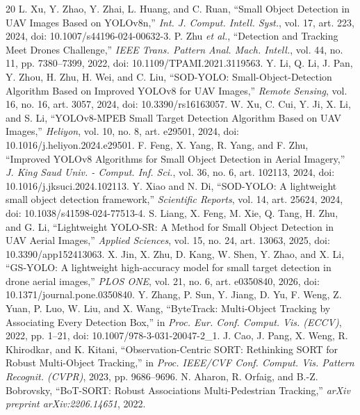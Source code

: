 \documentclass[conference]{IEEEtran}
\begin{document}
\begin{thebibliography}{20}
 L. Xu, Y. Zhao, Y. Zhai, L. Huang, and C. Ruan, ``Small Object Detection in UAV Images Based on YOLOv8n,'' \textit{Int. J. Comput. Intell. Syst.}, vol. 17, art. 223, 2024, doi: 10.1007/s44196-024-00632-3.
 P. Zhu \textit{et al.}, ``Detection and Tracking Meet Drones Challenge,'' \textit{IEEE Trans. Pattern Anal. Mach. Intell.}, vol. 44, no. 11, pp. 7380--7399, 2022, doi: 10.1109/TPAMI.2021.3119563.
 Y. Li, Q. Li, J. Pan, Y. Zhou, H. Zhu, H. Wei, and C. Liu, ``SOD-YOLO: Small-Object-Detection Algorithm Based on Improved YOLOv8 for UAV Images,'' \textit{Remote Sensing}, vol. 16, no. 16, art. 3057, 2024, doi: 10.3390/rs16163057.
 W. Xu, C. Cui, Y. Ji, X. Li, and S. Li, ``YOLOv8-MPEB Small Target Detection Algorithm Based on UAV Images,'' \textit{Heliyon}, vol. 10, no. 8, art. e29501, 2024, doi: 10.1016/j.heliyon.2024.e29501.
 F. Feng, X. Yang, R. Yang, and F. Zhu, ``Improved YOLOv8 Algorithms for Small Object Detection in Aerial Imagery,'' \textit{J. King Saud Univ. - Comput. Inf. Sci.}, vol. 36, no. 6, art. 102113, 2024, doi: 10.1016/j.jksuci.2024.102113.
 Y. Xiao and N. Di, ``SOD-YOLO: A lightweight small object detection framework,'' \textit{Scientific Reports}, vol. 14, art. 25624, 2024, doi: 10.1038/s41598-024-77513-4.
 S. Liang, X. Feng, M. Xie, Q. Tang, H. Zhu, and G. Li, ``Lightweight YOLO-SR: A Method for Small Object Detection in UAV Aerial Images,'' \textit{Applied Sciences}, vol. 15, no. 24, art. 13063, 2025, doi: 10.3390/app152413063.
 X. Jin, X. Zhu, D. Kang, W. Shen, Y. Zhao, and X. Li, ``GS-YOLO: A lightweight high-accuracy model for small target detection in drone aerial images,'' \textit{PLOS ONE}, vol. 21, no. 6, art. e0350840, 2026, doi: 10.1371/journal.pone.0350840.
 Y. Zhang, P. Sun, Y. Jiang, D. Yu, F. Weng, Z. Yuan, P. Luo, W. Liu, and X. Wang, ``ByteTrack: Multi-Object Tracking by Associating Every Detection Box,'' in \textit{Proc. Eur. Conf. Comput. Vis. (ECCV)}, 2022, pp. 1--21, doi: 10.1007/978-3-031-20047-2\_1.
 J. Cao, J. Pang, X. Weng, R. Khirodkar, and K. Kitani, ``Observation-Centric SORT: Rethinking SORT for Robust Multi-Object Tracking,'' in \textit{Proc. IEEE/CVF Conf. Comput. Vis. Pattern Recognit. (CVPR)}, 2023, pp. 9686--9696.
\newline\vfill\eject
{} N. Aharon, R. Orfaig, and B.-Z. Bobrovsky, ``BoT-SORT: Robust Associations Multi-Pedestrian Tracking,'' \textit{arXiv preprint arXiv:2206.14651}, 2022.

\end{thebibliography}
\end{document}
